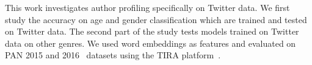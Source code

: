 \documentclass[conference]{IEEEtran}
\begin{document}
This work investigates author profiling specifically on Twitter data. We first study the accuracy on age and gender classification which are trained and tested on Twitter data. The second part of the study tests models trained on Twitter data on other genres. We used word embeddings as features and evaluated on PAN 2015 and 2016~\cite{rangel:2016} datasets using the TIRA platform~\cite{stein:2012o,stein:2014j}.  
%
%



%
%
\end{document}
